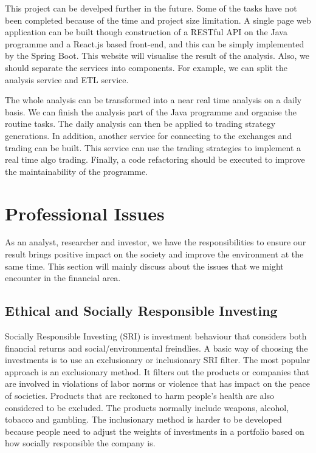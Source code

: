 \documentclass[11pt]{article} %
\theoremstyle{plain}
\theoremstyle{definition}
\begin{document}
This project can be develped further in the future. Some of the tasks have not been completed because of the time and project size limitation. A single page web application can be built though construction of a RESTful API on the Java programme and a React.js based front-end, and this can be simply implemented by the Spring Boot. This website will visualise the result of the analysis. Also, we should separate the services into components. For example, we can split the analysis service and ETL service.

The whole analysis can be transformed into a near real time analysis on a daily basis. We can finish the analysis part of the Java programme and organise the routine tasks. The daily analysis can then be applied to trading strategy generations. In addition, another service for connecting to the exchanges and trading can be built. This service can use the trading strategies to implement a real time algo trading. Finally, a code refactoring should be executed to improve the maintainability of the programme.

\section{Professional Issues}

As an analyst, researcher and investor, we have the responsibilities to ensure our result brings positive impact on the society and improve the environment at the same time. This section will mainly discuss about the issues that we might encounter in the financial area.

\subsection{Ethical and Socially Responsible Investing}

Socially Responsible Investing (SRI) is investment behaviour that considers both financial returns and social/environmental freindlies. A basic way of choosing the investments is to use an exclusionary or inclusionary SRI filter. The most popular approach is an exclusionary method. It filters out the products or companies that are involved in violations of labor norms or violence that has impact on the peace of societies. Products that are reckoned to harm people's health are also considered to be excluded. The products normally include weapons, alcohol, tobacco and gambling. The inclusionary method is harder to be developed because people need to adjust the weights of investments in a portfolio based on how socially responsible the company is\cite{Berry2013}.
\end{document}
